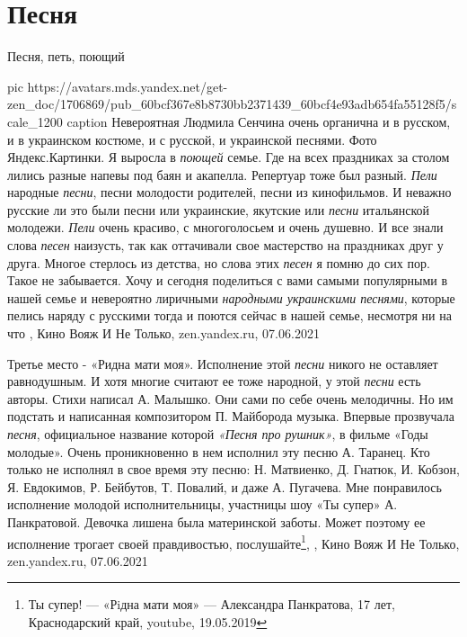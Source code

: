  
 
 
 
 
\chapter{Песня}

Песня, петь, поющий

\ifcmt
  pic https://avatars.mds.yandex.net/get-zen_doc/1706869/pub_60bcf367e8b8730bb2371439_60bcf4e93adb654fa55128f5/scale_1200
	caption Невероятная Людмила Сенчина очень органична и в русском, и в украинском костюме, и с русской, и украинской песнями. Фото Яндекс.Картинки.
\fi
Я выросла в \emph{поющей} семье. Где на всех праздниках за столом лились разные напевы
под баян и акапелла. Репертуар тоже был разный. \emph{Пели} народные \emph{песни}, песни
молодости родителей, песни из кинофильмов. И неважно русские ли это были песни
или украинские, якутские или \emph{песни} итальянской молодежи. \emph{Пели} очень красиво, с
многоголосьем и очень душевно. И все знали слова \emph{песен} наизусть, так как
оттачивали свое мастерство на праздниках друг у друга.  Многое стерлось из
детства, но слова этих \emph{песен} я помню до сих пор. Такое не забывается.  Хочу и
сегодня поделиться с вами самыми популярными в нашей семье и невероятно
лиричными \emph{народными украинскими песнями}, которые пелись наряду с русскими тогда
и поются сейчас в нашей семье, несмотря ни на что
, 
Кино Вояж И Не Только, zen.yandex.ru, 07.06.2021

Третье место - «Ридна мати моя». Исполнение этой \emph{песни} никого не
оставляет равнодушным. И хотя многие считают ее тоже народной, у этой
\emph{песни} есть авторы. Стихи написал А. Малышко. Они сами по себе очень
мелодичны. Но им подстать и написанная композитором П. Майборода музыка.
Впервые прозвучала \emph{песня}, официальное название которой \emph{«Песня про
рушник»}, в фильме «Годы молодые». Очень проникновенно в нем исполнил эту песню
А. Таранец. Кто только не исполнял в свое время эту песню: Н. Матвиенко, Д.
Гнатюк, И. Кобзон, Я. Евдокимов, Р. Бейбутов, Т. Повалий, и даже А. Пугачева.
Мне понравилось исполнение молодой исполнительницы, участницы шоу «Ты супер» А.
Панкратовой. Девочка лишена была материнской заботы. Может поэтому ее
исполнение трогает своей правдивостью, послушайте\footnote{Ты супер! — «Рiдна
мати моя» — Александра Панкратова, 17 лет, Краснодарский край, youtube,
19.05.2019},
, 
Кино Вояж И Не Только, zen.yandex.ru, 07.06.2021


